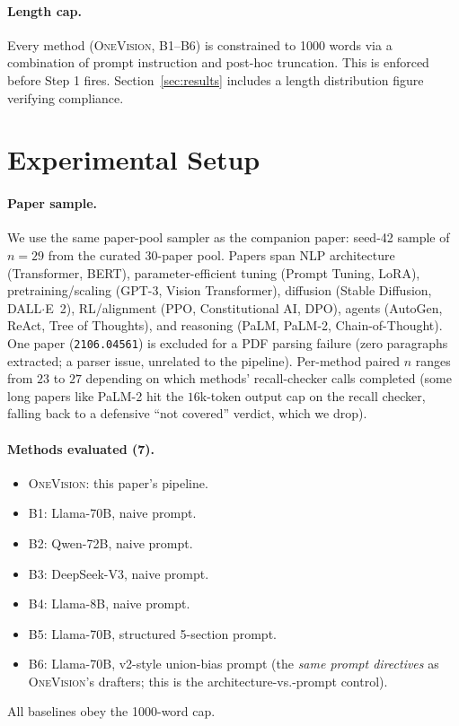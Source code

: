 \documentclass[11pt,a4paper]{article}
\begin{document}
\paragraph{Length cap.}
Every method (\textsc{OneVision}, B1--B6) is constrained to 1000
words via a combination of prompt instruction and post-hoc
truncation. This is enforced before Step 1 fires. Section~\ref{sec:results}
includes a length distribution figure verifying compliance.

\section{Experimental Setup}
\label{sec:setup}

\paragraph{Paper sample.}
We use the same paper-pool sampler as the companion paper:
seed-42 sample of $n=29$ from the curated 30-paper pool. Papers
span NLP architecture (Transformer, BERT), parameter-efficient
tuning (Prompt Tuning, LoRA), pretraining/scaling (GPT-3, Vision
Transformer), diffusion (Stable Diffusion, DALL$\cdot$E~2),
RL/alignment (PPO, Constitutional AI, DPO), agents (AutoGen,
ReAct, Tree of Thoughts), and reasoning (PaLM, PaLM-2,
Chain-of-Thought). One paper (\texttt{2106.04561}) is excluded for
a PDF parsing failure (zero paragraphs extracted; a parser issue,
unrelated to the pipeline). Per-method paired $n$ ranges from $23$
to $27$ depending on which methods' recall-checker calls completed
(some long papers like PaLM-2 hit the $16$k-token output cap on the
recall checker, falling back to a defensive ``not covered''
verdict, which we drop).

\paragraph{Methods evaluated (7).}
\begin{itemize}[leftmargin=*,itemsep=1pt]
    \item \textsc{OneVision}: this paper's pipeline.
    \item B1: Llama-70B, naive prompt.
    \item B2: Qwen-72B, naive prompt.
    \item B3: DeepSeek-V3, naive prompt.
    \item B4: Llama-8B, naive prompt.
    \item B5: Llama-70B, structured 5-section prompt.
    \item B6: Llama-70B, v2-style union-bias prompt
          (the \emph{same prompt directives} as \textsc{OneVision}'s
          drafters; this is the architecture-vs.-prompt control).
\end{itemize}
All baselines obey the 1000-word cap.
\end{document}
